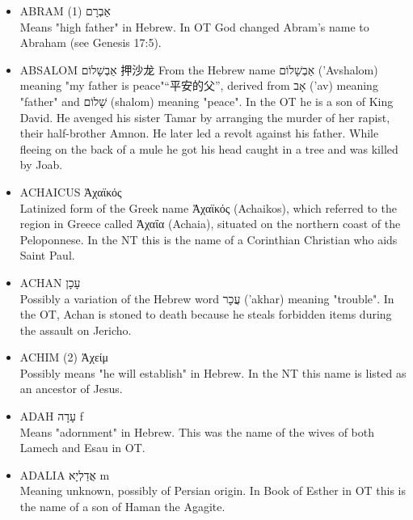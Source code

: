 \begin{itemize}
\item {ABRAM (1) אַבְרָם }\\
Means "high father" in Hebrew. In OT God changed Abram's name to Abraham (see Genesis 17:5).

\item {ABSALOM אַבְשָׁלוֹם 押沙龙}
From the Hebrew name אַבְשָׁלוֹם ('Avshalom) meaning "my father is peace"“平安的父”, derived from אָב ('av) meaning "father" and שָׁלוֹם (shalom) meaning "peace". In the OT he is a son of King David. He avenged his sister Tamar by arranging the murder of her rapist, their half-brother Amnon. He later led a revolt against his father. While fleeing on the back of a mule he got his head caught in a tree and was killed by Joab.

\item {ACHAICUS Ἀχαϊκός }\\
Latinized form of the Greek name Ἀχαϊκός (Achaikos), which referred to the region in Greece called Ἀχαΐα (Achaia), situated on the northern coast of the Peloponnese. In the NT this is the name of a Corinthian Christian who aids Saint Paul.
\item {ACHAN עָכָן}\\
Possibly a variation of the Hebrew word עֲכָר ('akhar) meaning "trouble". In the OT, Achan is stoned to death because he steals forbidden items during the assault on Jericho.
\item {ACHIM (2) Ἀχείμ}\\
Possibly means "he will establish" in Hebrew. In the NT this name is listed as an ancestor of Jesus.
\item {ADAH עָדָה f}\\
Means "adornment" in Hebrew. This was the name of the wives of both Lamech and Esau in OT.
\item {ADALIA אֲדַלְיָא m}\\
Meaning unknown, possibly of Persian origin. In Book of Esther in OT this is the name of a son of Haman the Agagite.


\end{itemize}
